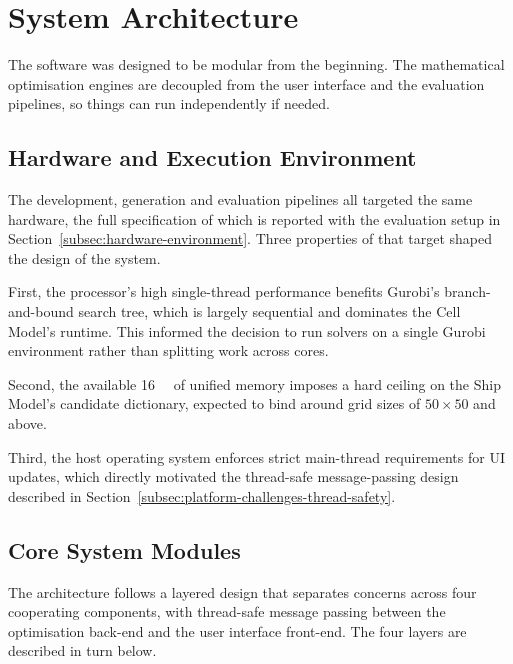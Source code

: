 \section{System Architecture}\label{sec:system-architecture}

The software was designed to be modular from the beginning. The mathematical optimisation engines are decoupled from the user interface and the evaluation pipelines, so things can run independently if needed.

\subsection{Hardware and Execution Environment}\label{subsec:hardware-execution-env}

The development, generation and evaluation pipelines all targeted the same hardware, the full specification of which is reported with the evaluation setup in Section~\ref{subsec:hardware-environment}. Three properties of that target shaped the design of the system.

First, the processor's high single-thread performance benefits Gurobi's branch-and-bound search tree, which is largely sequential and dominates the Cell Model's runtime. This informed the decision to run solvers on a single Gurobi environment rather than splitting work across cores. 

Second, the available 16~\si{\giga\byte} of unified memory imposes a hard ceiling on the Ship Model's candidate dictionary, expected to bind around grid sizes of $50 \times 50$ and above. 

Third, the host operating system enforces strict main-thread requirements for UI updates, which directly motivated the thread-safe message-passing design described in Section~\ref{subsec:platform-challenges-thread-safety}.

\subsection{Core System Modules}\label{subsec:core-sys-modules}

The architecture follows a layered design that separates concerns across four cooperating components, with thread-safe message passing between the optimisation back-end and the user interface front-end. The four layers are described in turn below.

